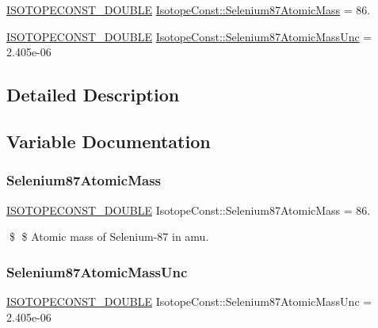 \begin{DoxyCompactItemize}
\item 
\mbox{\hyperlink{group___isotope_const-_macros_ga8f45a7272ce02c0b4c65c44636ed719a}{I\+S\+O\+T\+O\+P\+E\+C\+O\+N\+S\+T\+\_\+\+D\+O\+U\+B\+LE}} \mbox{\hyperlink{group___isotope_const-_selenium-_se87_gae4d797603c5d4858b8dfb825358f36c7}{Isotope\+Const\+::\+Selenium87\+Atomic\+Mass}} = 86.
\item 
\mbox{\hyperlink{group___isotope_const-_macros_ga8f45a7272ce02c0b4c65c44636ed719a}{I\+S\+O\+T\+O\+P\+E\+C\+O\+N\+S\+T\+\_\+\+D\+O\+U\+B\+LE}} \mbox{\hyperlink{group___isotope_const-_selenium-_se87_ga90081149595aa0ab5b237569f58062f9}{Isotope\+Const\+::\+Selenium87\+Atomic\+Mass\+Unc}} = 2.\+405e-\/06
\end{DoxyCompactItemize}


\subsection{Detailed Description}


\subsection{Variable Documentation}
\mbox{\label{group___isotope_const-_selenium-_se87_gae4d797603c5d4858b8dfb825358f36c7}} 
\subsubsection{\texorpdfstring{Selenium87\+Atomic\+Mass}{Selenium87AtomicMass}}
{\footnotesize\ttfamily \mbox{\hyperlink{group___isotope_const-_macros_ga8f45a7272ce02c0b4c65c44636ed719a}{I\+S\+O\+T\+O\+P\+E\+C\+O\+N\+S\+T\+\_\+\+D\+O\+U\+B\+LE}} Isotope\+Const\+::\+Selenium87\+Atomic\+Mass = 86.}

\$ \$ Atomic mass of Selenium-\/87 in amu. \mbox{\label{group___isotope_const-_selenium-_se87_ga90081149595aa0ab5b237569f58062f9}} 
\subsubsection{\texorpdfstring{Selenium87\+Atomic\+Mass\+Unc}{Selenium87AtomicMassUnc}}
{\footnotesize\ttfamily \mbox{\hyperlink{group___isotope_const-_macros_ga8f45a7272ce02c0b4c65c44636ed719a}{I\+S\+O\+T\+O\+P\+E\+C\+O\+N\+S\+T\+\_\+\+D\+O\+U\+B\+LE}} Isotope\+Const\+::\+Selenium87\+Atomic\+Mass\+Unc = 2.\+405e-\/06}

